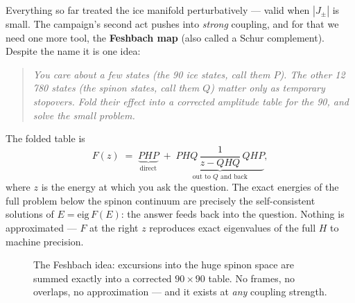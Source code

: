 \documentclass[11pt,a4paper]{article}
\newcommand{\Jpm}{J_{\pm}}
\begin{document}
Everything so far treated the ice manifold perturbatively --- valid when
$|\Jpm|$ is small.  The campaign's second act pushes into \emph{strong}
coupling, and for that we need one more tool, the \textbf{Feshbach map}
(also called a Schur complement).  Despite the name it is one idea:

\begin{quote}
\emph{You care about a few states (the 90 ice states, call them $P$).  The
other 12\,780 states (the spinon states, call them $Q$) matter only as
temporary stopovers.  Fold their effect into a corrected amplitude table for
the 90, and solve the small problem.}
\end{quote}

The folded table is
\begin{equation}
F(z) \;=\; \underbrace{PHP}_{\text{direct}} \;+\;
\underbrace{PHQ\,\frac{1}{z-QHQ}\,QHP}_{\text{out to }Q\text{ and back}},
\label{eq:feshbach}
\end{equation}
where $z$ is the energy at which you ask the question.  The exact energies of
the full problem below the spinon continuum are precisely the
self-consistent solutions of $E = \mathrm{eig}\,F(E)$: the answer feeds back
into the question.  Nothing is approximated --- $F$ at the right $z$
reproduces exact eigenvalues of the full $H$ to machine precision.

\begin{figure}[h]
\centering
{}
\caption{The Feshbach idea: excursions into the huge spinon space are summed
exactly into a corrected $90\times90$ table.  No frames, no overlaps, no
approximation --- and it exists at \emph{any} coupling strength.}
\label{fig:feshbach}
\end{figure}
\end{document}
